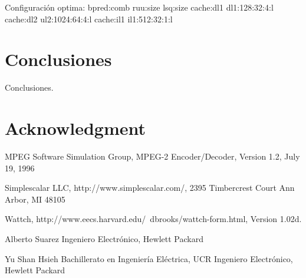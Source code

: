 \documentclass[journal]{IEEEtran}
\begin{document}
Configuraci\'on optima:
bpred:comb
ruu:size
lsq:size
cache:dl1       dl1:128:32:4:l
cache:dl2       ul2:1024:64:4:l
cache:il1       il1:512:32:1:l

\section{Conclusiones}
Conclusiones.

\section*{Acknowledgment}

\begin{thebibliography}{1}
MPEG Software Simulation Group, MPEG-2 Encoder/Decoder, Version 1.2, July 19, 1996

Simplescalar LLC, http://www.simplescalar.com/, 2395 Timbercrest Court Ann Arbor, MI 48105

Wattch, http://www.eecs.harvard.edu/~dbrooks/wattch-form.html, Version 1.02d.

\end{thebibliography}

\begin{IEEEbiographynophoto}{Alberto Suarez}
Ingeniero Electr\'{o}nico, Hewlett Packard
\end{IEEEbiographynophoto}

\begin{IEEEbiographynophoto}{Yu Shan Hsieh}
Bachillerato en Ingenier\'{i}a El\'{e}ctrica, UCR
Ingeniero Electr\'{o}nico, Hewlett Packard
\end{IEEEbiographynophoto}
\end{document}
